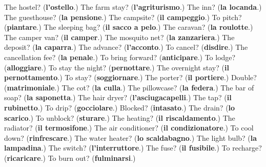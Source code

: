 \begin{tcolorbox}[breakable,colback=teal!4,colframe=teal!35!black,title={Before you move on}]
The hostel? (\textbf{l'ostello}.) The farm stay? (\textbf{l'agriturismo}.) The inn? (\textbf{la locanda}.) The guesthouse? (\textbf{la pensione}.) The campsite? (\textbf{il campeggio}.) To pitch? (\textbf{piantare}.) The sleeping bag? (\textbf{il sacco a pelo}.) The caravan? (\textbf{la roulotte}.) The camper van? (\textbf{il camper}.) The mosquito net? (\textbf{la zanzariera}.) The deposit? (\textbf{la caparra}.) The advance? (\textbf{l'acconto}.) To cancel? (\textbf{disdire}.) The cancellation fee? (\textbf{la penale}.) To bring forward? (\textbf{anticipare}.) To lodge? (\textbf{alloggiare}.) To stay the night? (\textbf{pernottare}.) The overnight stay? (\textbf{il pernottamento}.) To stay? (\textbf{soggiornare}.) The porter? (\textbf{il portiere}.) Double? (\textbf{matrimoniale}.) The cot? (\textbf{la culla}.) The pillowcase? (\textbf{la federa}.) The bar of soap? (\textbf{la saponetta}.) The hair dryer? (\textbf{l'asciugacapelli}.) The tap? (\textbf{il rubinetto}.) To drip? (\textbf{gocciolare}.) Blocked? (\textbf{intasato}.) The drain? (\textbf{lo scarico}.) To unblock? (\textbf{sturare}.) The heating? (\textbf{il riscaldamento}.) The radiator? (\textbf{il termosifone}.) The air conditioner? (\textbf{il condizionatore}.) To cool down? (\textbf{rinfrescare}.) The water heater? (\textbf{lo scaldabagno}.) The light bulb? (\textbf{la lampadina}.) The switch? (\textbf{l'interruttore}.) The fuse? (\textbf{il fusibile}.) To recharge? (\textbf{ricaricare}.) To burn out? (\textbf{fulminarsi}.)
\end{tcolorbox}
